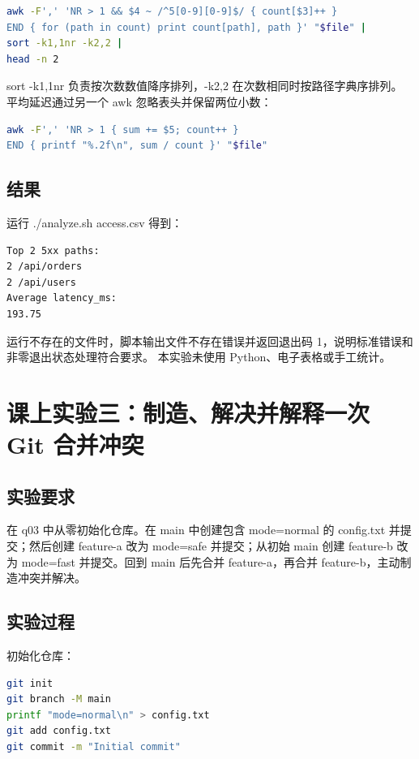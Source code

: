 \documentclass[UTF8]{ctexart}
\begin{document}
\begin{lstlisting}[language=bash]
awk -F',' 'NR > 1 && $4 ~ /^5[0-9][0-9]$/ { count[$3]++ }
END { for (path in count) print count[path], path }' "$file" |
sort -k1,1nr -k2,2 |
head -n 2
\end{lstlisting}

sort -k1,1nr 负责按次数数值降序排列，-k2,2 在次数相同时按路径字典序排列。
平均延迟通过另一个 awk 忽略表头并保留两位小数：

\begin{lstlisting}[language=bash]
awk -F',' 'NR > 1 { sum += $5; count++ }
END { printf "%.2f\n", sum / count }' "$file"
\end{lstlisting}

\subsection{结果}

运行 ./analyze.sh access.csv 得到：

\begin{lstlisting}
Top 2 5xx paths:
2 /api/orders
2 /api/users
Average latency_ms:
193.75
\end{lstlisting}

运行不存在的文件时，脚本输出文件不存在错误并返回退出码 1，说明标准错误和非零退出状态处理符合要求。
本实验未使用 Python、电子表格或手工统计。


\section{课上实验三：制造、解决并解释一次 Git 合并冲突}

\subsection{实验要求}

在 q03 中从零初始化仓库。在 main 中创建包含 mode=normal 的 config.txt 并提交；然后创建 feature-a
改为 mode=safe 并提交；从初始 main 创建 feature-b 改为 mode=fast 并提交。回到 main 后先合并
feature-a，再合并 feature-b，主动制造冲突并解决。

\subsection{实验过程}

初始化仓库：

\begin{lstlisting}[language=bash]
git init
git branch -M main
printf "mode=normal\n" > config.txt
git add config.txt
git commit -m "Initial commit"
\end{lstlisting}
\end{document}
